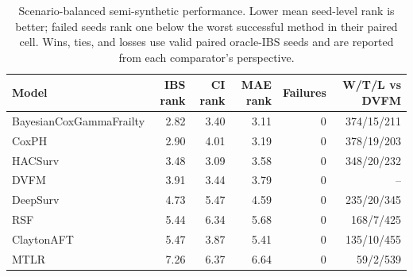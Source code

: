 \begin{table}
\caption{Scenario-balanced semi-synthetic performance. Lower mean seed-level rank is better; failed seeds rank one below the worst successful method in their paired cell. Wins, ties, and losses use valid paired oracle-IBS seeds and are reported from each comparator's perspective.}
\label{tab:semi_synthetic_models}
\begin{tabular}{lrrrrr}
\toprule
Model & IBS rank & CI rank & MAE rank & Failures & W/T/L vs DVFM \\
\midrule
BayesianCoxGammaFrailty & 2.82 & 3.40 & 3.11 & 0 & 374/15/211 \\
CoxPH & 2.90 & 4.01 & 3.19 & 0 & 378/19/203 \\
HACSurv & 3.48 & 3.09 & 3.58 & 0 & 348/20/232 \\
DVFM & 3.91 & 3.44 & 3.79 & 0 & -- \\
DeepSurv & 4.73 & 5.47 & 4.59 & 0 & 235/20/345 \\
RSF & 5.44 & 6.34 & 5.68 & 0 & 168/7/425 \\
ClaytonAFT & 5.47 & 3.87 & 5.41 & 0 & 135/10/455 \\
MTLR & 7.26 & 6.37 & 6.64 & 0 & 59/2/539 \\
\bottomrule
\end{tabular}
\end{table}
